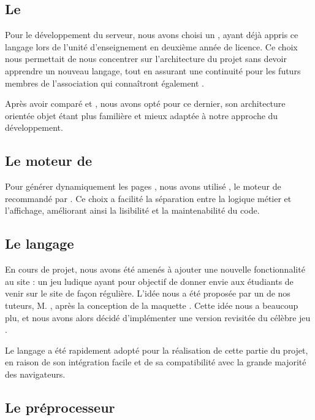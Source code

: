 \subsection{Le  }
\label{subsec:symfony}

Pour le développement du serveur, nous avons choisi un  , ayant déjà appris ce langage lors de l’unité d’enseignement  en deuxième année de licence. Ce choix nous permettait de nous concentrer sur l’architecture du projet sans devoir apprendre un nouveau langage, tout en assurant une continuité pour les futurs membres de l’association qui connaîtront également .

Après avoir comparé  et , nous avons opté pour ce dernier, son architecture orientée objet étant plus familière et mieux adaptée à notre approche du développement.

\subsection{Le moteur de  }
\label{subsec:twig}

Pour générer dynamiquement les pages , nous avons utilisé , le moteur de  recommandé par . Ce choix a facilité la séparation entre la logique métier et l'affichage, améliorant ainsi la lisibilité et la maintenabilité du code.

\subsection{Le langage }
\label{subsec:javascript}

En cours de projet, nous avons été amenés à ajouter une nouvelle fonctionnalité au site : un jeu ludique ayant pour objectif de donner envie aux étudiants de venir sur le site de façon régulière.
L'idée nous a été proposée par un de nos tuteurs, M. , après la conception de la maquette .
Cette idée nous a beaucoup plu, et nous avons alors décidé d'implémenter une version revisitée du célèbre jeu .

Le langage  a été rapidement adopté pour la réalisation de cette partie du projet, en raison de son intégration facile et de sa compatibilité avec la grande majorité des navigateurs.

\subsection{Le préprocesseur }

